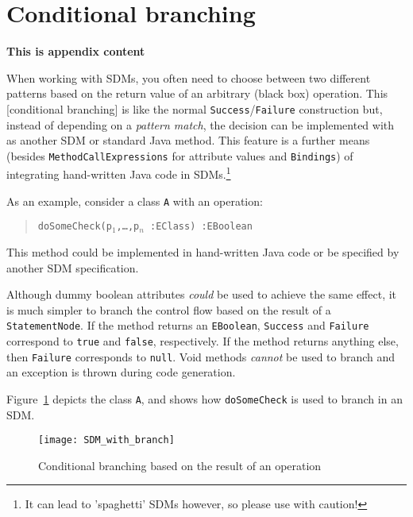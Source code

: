 \newpage
\section{Conditional branching}
\genHeader
\hypertarget{sec:conBran}{}

{\bf \large This is appendix content}

\vspace{1cm}

When working with SDMs, you often need to choose between two different patterns based on the return value of an arbitrary (black box) operation.
This [conditional branching] is like the normal \texttt{Success}/\texttt{Failure} construction but, instead of depending on a \emph{pattern match}, the decision
can be implemented with as another SDM or standard Java method. This feature is a further means (besides \texttt{MethodCallExpressions} for attribute values and
\texttt{Bindings}) of integrating hand-written Java code in SDMs.\footnote{It can lead to 'spaghetti' SDMs however, so please use with caution!}

As an example, consider a class \texttt{A} with an operation:
\begin{quote}
 \mbox{\texttt{doSomeCheck(p$_1$,\ldots,p$_n$ :EClass) :EBoolean}}
\end{quote}

This method could be implemented in hand-written Java code or be specified by another SDM specification.

Although dummy boolean attributes \emph{could} be used to achieve the same effect, it is much simpler to branch the control flow based on the result of a \texttt{StatementNode}.
If the method returns an \texttt{EBoolean}, \texttt{Success} and \texttt{Failure} correspond to \texttt{true} and \texttt{false}, respectively. If the method returns anything else, then \texttt{Failure} corresponds to \texttt{null}. Void methods \emph{cannot} be used to branch and an exception is thrown during code generation.

Figure~\ref{fig:cond_branch_on_op} depicts the class \texttt{A}, and shows how \texttt{doSomeCheck} is used to branch in an SDM.

\newpage

\vspace*{3cm}

\begin{figure}[htp]
\begin{center}
  \texttt{[image: SDM\_with\_branch]}
  \caption{Conditional branching based on the result of an operation}
  \label{fig:cond_branch_on_op}
\end{center}
\end{figure}





